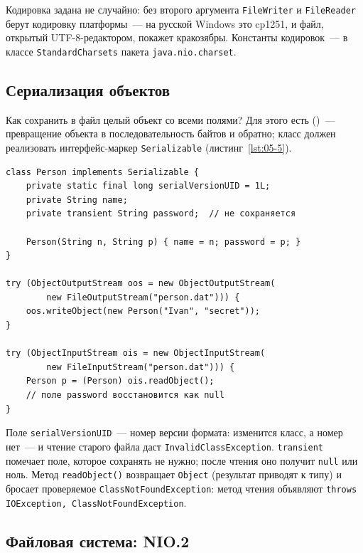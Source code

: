 Кодировка задана не случайно: без второго аргумента \texttt{FileWriter} и
\texttt{FileReader} берут кодировку платформы~--- на русской Windows это cp1251,
и файл, открытый UTF-8-редактором, покажет кракозябры. Константы кодировок~---
в классе \texttt{StandardCharsets} пакета \texttt{java.nio.charset}.

\subsection{Сериализация объектов}

Как сохранить в файл целый объект со всеми полями? Для этого есть
 ()~--- превращение объекта в
последовательность байтов и обратно; класс должен реализовать интерфейс-маркер
\texttt{Serializable} (листинг~\ref{lst:05-5}).

\begin{listing}[H]
\begin{verbatim}
class Person implements Serializable {
    private static final long serialVersionUID = 1L;
    private String name;
    private transient String password;  // не сохраняется

    Person(String n, String p) { name = n; password = p; }
}

try (ObjectOutputStream oos = new ObjectOutputStream(
        new FileOutputStream("person.dat"))) {
    oos.writeObject(new Person("Ivan", "secret"));
}

try (ObjectInputStream ois = new ObjectInputStream(
        new FileInputStream("person.dat"))) {
    Person p = (Person) ois.readObject();
    // поле password восстановится как null
}
\end{verbatim}
\caption{Сохранение объекта в файл и чтение обратно}
\label{lst:05-5}
\end{listing}

Поле \texttt{serialVersionUID}~--- номер версии формата: изменится класс, а номер
нет~--- и чтение старого файла даст \texttt{InvalidClassException}.
\texttt{transient} помечает поле, которое сохранять не нужно; после чтения оно
получит \texttt{null} или ноль. Метод \texttt{readObject()} возвращает
\texttt{Object} (результат приводят к типу) и бросает проверяемое
\texttt{ClassNotFoundException}: метод чтения объявляют \texttt{throws
IOException, ClassNotFoundException}.

\subsection{Файловая система: NIO.2}

